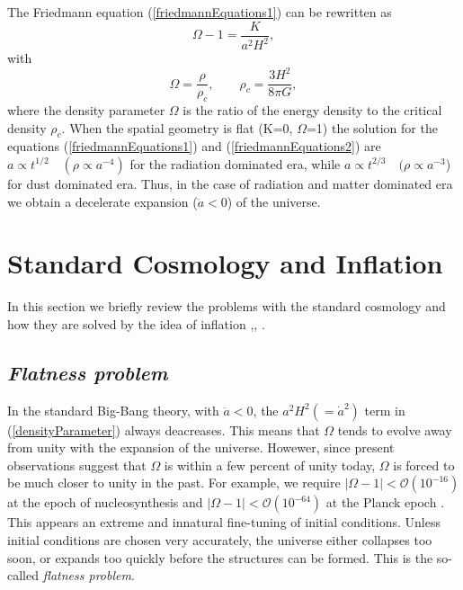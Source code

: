 \documentclass[11pt,a4paper,twoside]{book}
\begin{document}
The Friedmann equation (\ref{friedmannEquations1}) can be rewritten as 
\begin{equation}
	\label{densityParameter}
	\Omega - 1 = \frac{K}{a^{2}H^{2}},
\end{equation}
with 
\begin{equation}
	\label{criticalDensity}
	\Omega=\frac{\rho}{\rho_{c}}, \quad     \quad   \rho_{c}=\frac{3H^{2}}{8\pi G},
\end{equation}
where the density parameter $ \Omega $ is the ratio of the energy density to the critical density $ \rho_{c} $.
When the spatial geometry is flat (K=0, $ \Omega $=1) the solution for the equations (\ref{friedmannEquations1})
and (\ref{friedmannEquations2}) are $ a \propto t^{1/2} \quad  (\rho \propto a^{-4}) $ for the radiation dominated era, while $ a\propto t^{2/3} \quad  (  \rho \propto  a^{-3}$) for dust dominated era.
Thus, in the case of radiation and matter dominated era we obtain a decelerate expansion ($ \ddot{a} < 0 $) of the universe.

\section{Standard Cosmology and Inflation}
In this section we briefly review the problems with the standard cosmology and how they are solved by the idea of inflation \cite{Liddle:intro},\cite{Dodelson:Chap1}, \cite{InflationDynamicsAndReheating:chap1}. 

\subsection*{\emph{Flatness problem}}
In the standard Big-Bang theory, with $ \ddot{a} < 0  $, the $ a^{2}H^{2} (= \dot{a}^{2}) $ term in (\ref{densityParameter}) always deacreases. This means that
$ \Omega $ tends to evolve away from unity with the expansion of the universe. Howewer, since present observations suggest that $ \Omega  $ is within a few percent of unity today, $ \Omega $ is forced to be much closer to unity in the past. For example, we require $ |\Omega-1| < \mathcal{O}(10^{-16}) $ at the epoch of nucleosynthesis and  $ |\Omega-1| < \mathcal{O}(10^{-64}) $ at the Planck epoch \cite{Liddle:intro}. This appears an extreme and innatural fine-tuning of initial conditions. Unless initial conditions are chosen  very accurately, the universe either collapses too soon, or expands too quickly before the structures can be formed. This is the so-called \textit{flatness problem}.
\end{document}
